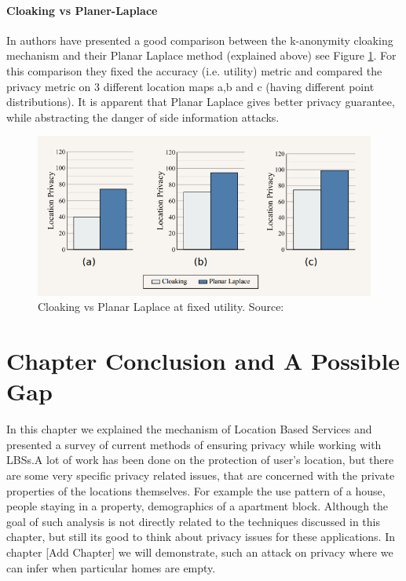 \documentclass{report}
\begin{document}
\paragraph{Cloaking vs Planer-Laplace}
In \cite{andres2013geo} authors have presented a good comparison between the k-anonymity cloaking mechanism and their Planar Laplace method (explained above) see Figure \ref{fig:CloakingVsPlanar}. For this comparison they fixed the accuracy (i.e. utility) metric and compared the privacy metric on 3 different location maps a,b and c (having different point distributions). It is apparent that Planar Laplace gives better privacy guarantee, while abstracting the danger of side information attacks.

\begin{figure}[ht]
\centering
        \includegraphics[width=120mm,scale=1]{Images/CloakingVsLaplace.PNG}
    \caption{Cloaking vs Planar Laplace at fixed utility. Source:\cite{andres2013geo}}
    \label{fig:CloakingVsPlanar}
\end{figure}


\section{Chapter Conclusion and A Possible Gap}
In this chapter we explained the mechanism of Location Based Services and presented a survey of current methods of ensuring privacy while working with LBSs.A lot of work has been done on the protection of user's location, but there are some very specific privacy related issues, that are concerned with the private properties of the locations themselves. For example the use pattern of a house, people staying in a property, demographics of a apartment block. Although the goal of such analysis is not directly related to the techniques discussed in this chapter, but still its good to think about privacy issues for these applications. In chapter [Add Chapter] we will demonstrate, such an attack on privacy where we can infer when particular homes are empty.
\end{document}

